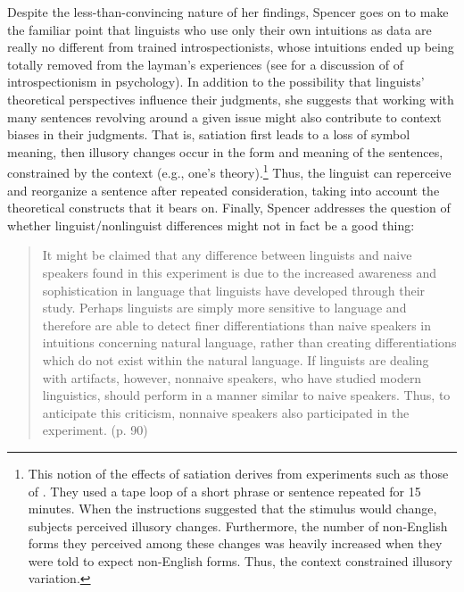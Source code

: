 Despite the less-than-convincing nature of her findings, Spencer goes on to make the familiar point that linguists who use only their own intuitions as data are really no different from trained introspectionists, whose intuitions ended up being totally removed from the layman's experiences (see  for a discussion of  of introspectionism in psychology). In addition to the possibility that linguists' theoretical perspectives influence their judgments, she suggests that working with many sentences revolving around a given issue might also contribute to context biases in their judgments. That is, satiation first leads to a loss of symbol meaning, then illusory changes occur in the form and meaning of the sentences, constrained by the context (e.g., one's theory).\footnote{This notion of the effects of satiation derives from experiments such as those of \citet{TaylorEtAl1963}. They used a tape loop of a short phrase or sentence repeated for 15 minutes. When the instructions suggested that the stimulus would change, subjects perceived illusory changes. Furthermore, the number of non-English forms they perceived among these changes was heavily increased when they were told to expect non-English forms. Thus, the context constrained illusory variation.
}
 Thus, the linguist can reperceive and reorganize a sentence after repeated consideration, taking into account the theoretical constructs that it bears on. Finally, Spencer addresses the question of whether linguist/nonlinguist differences might not in fact be a good thing:

 \begin{quote}
It might be claimed that any difference between linguists and naive speakers found in this experiment is due to the increased awareness and sophistication in language that linguists have developed through their study. Perhaps linguists are simply more sensitive to language and therefore are able to detect finer differentiations than naive speakers in intuitions concerning natural language, rather than creating differentiations which do not exist within the natural language. If linguists are dealing with artifacts, however, nonnaive speakers, who have studied modern linguistics, should perform in a manner similar to naive speakers. Thus, to anticipate this criticism, nonnaive speakers also participated in the experiment. (p. 90)
 \end{quote}

